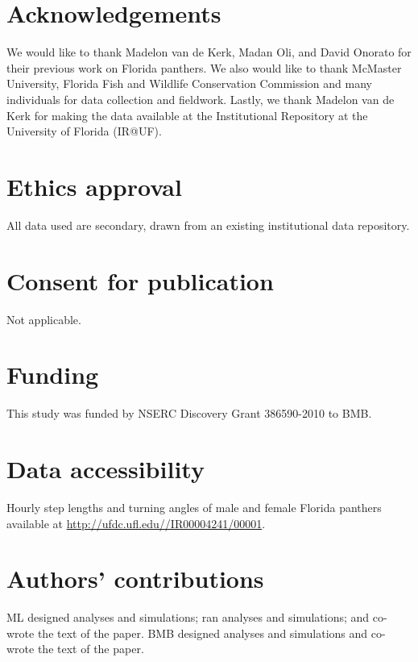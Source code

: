 \documentclass{bmcart}
\begin{document}

\begin{backmatter}

\section*{Acknowledgements}

We would like to thank Madelon van de Kerk, Madan Oli, and David Onorato for their previous work on Florida panthers. We also would like to thank McMaster University, Florida Fish and Wildlife Conservation Commission and many individuals for data collection and fieldwork. Lastly, we thank Madelon van de Kerk for making the data available at the Institutional Repository at the University of Florida (IR@UF).

\section*{Ethics approval}

All data used are secondary, drawn from an existing institutional
data repository.

\section*{Consent for publication}

Not applicable.
  
\section*{Funding}

This study was funded by NSERC Discovery Grant 386590-2010 to BMB.

\section{Data accessibility}
Hourly step lengths and turning angles of male and female Florida panthers available at \url{http://ufdc.ufl.edu//IR00004241/00001}.

\section*{Authors' contributions}
ML designed analyses and simulations; ran analyses and simulations; and co-wrote the text of the paper.  BMB designed analyses and simulations and co-wrote the text of the paper.


\end{backmatter}
\end{document}

